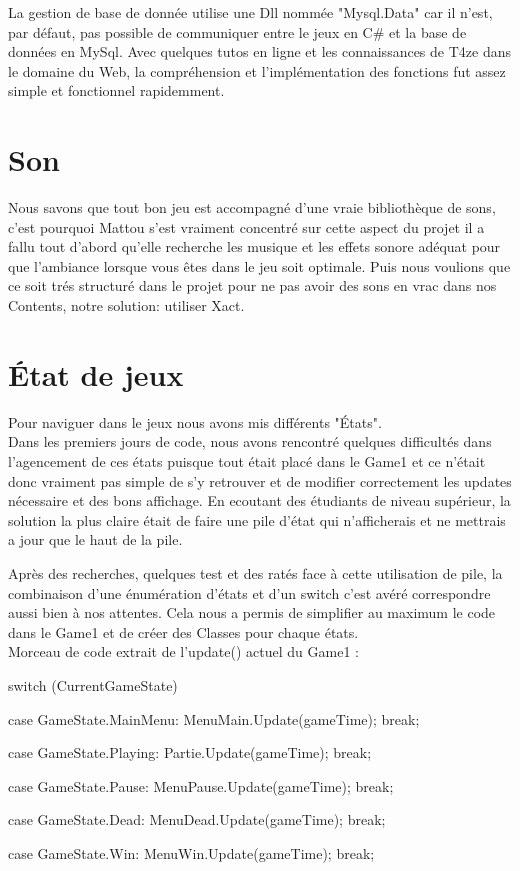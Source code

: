 \documentclass [11pt]{report}
\begin{document}
	La gestion de base de donnée utilise une Dll nommée "Mysql.Data" car il n'est, par défaut, pas possible de communiquer entre le jeux en C\# et la base de données en MySql. 
	Avec quelques tutos en ligne et les connaissances de T4ze dans le domaine du Web, la compréhension et l'implémentation des fonctions fut assez simple et fonctionnel rapidemment.
	
	
	\vspace{10mm}


	\section{Son}
	Nous savons que tout bon jeu est accompagné d'une vraie bibliothèque de sons, c'est pourquoi Mattou s'est vraiment concentré sur cette aspect du projet il a fallu tout d'abord qu'elle recherche les musique et les effets sonore adéquat pour que l'ambiance lorsque vous êtes dans le jeu soit optimale. Puis nous voulions que ce soit trés structuré dans le projet pour ne pas avoir des sons en vrac dans nos Contents, notre solution: utiliser Xact. 
	
	
	\vspace{10mm}
	
	
	\section{\'Etat de jeux}
	Pour naviguer dans le jeux nous avons mis différents "États". \\
	
	Dans les premiers jours de code, nous avons rencontré quelques difficultés dans l'agencement de ces états puisque tout était placé dans le Game1 et ce n'était donc vraiment pas simple de s'y retrouver et de modifier correctement les updates nécessaire et des bons affichage. En ecoutant des étudiants de niveau supérieur, la solution la plus claire était de faire une pile d'état qui n'afficherais et ne mettrais a jour que le haut de la pile.
	
	Après des recherches, quelques test et des ratés face à cette utilisation de pile, la combinaison d'une énumération d'états et d'un switch c'est avéré correspondre aussi bien à nos attentes. Cela nous a permis de simplifier au maximum le code dans le Game1 et de créer des Classes pour chaque états.\\
			
	\noindent Morceau de code extrait de l'update() actuel du Game1 :
	
	
	\begin{mylisting}
			
	switch (CurrentGameState)
	{
		case GameState.MainMenu:
			MenuMain.Update(gameTime);
			break;
			
		case GameState.Playing:
			Partie.Update(gameTime);
			break;
			
		case GameState.Pause:
			MenuPause.Update(gameTime);
			break;
			
		case GameState.Dead:
			MenuDead.Update(gameTime);		
			break;
			
		case GameState.Win:
			MenuWin.Update(gameTime);
			break;
	}
			\end{mylisting}
	
\end{document}
